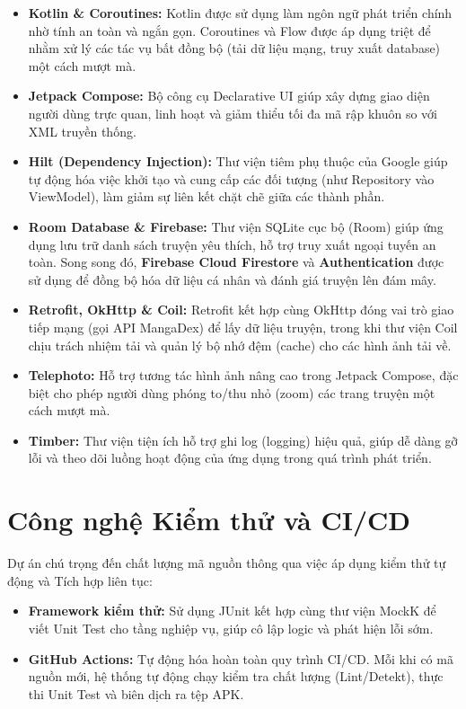 \begin{itemize}
    \item \textbf{Kotlin \& Coroutines:} Kotlin được sử dụng làm ngôn ngữ phát triển chính nhờ tính an toàn và ngắn gọn. Coroutines và Flow được áp dụng triệt để nhằm xử lý các tác vụ bất đồng bộ (tải dữ liệu mạng, truy xuất database) một cách mượt mà.
    \item \textbf{Jetpack Compose:} Bộ công cụ Declarative UI giúp xây dựng giao diện người dùng trực quan, linh hoạt và giảm thiểu tối đa mã rập khuôn so với XML truyền thống.
    \item \textbf{Hilt (Dependency Injection):} Thư viện tiêm phụ thuộc của Google giúp tự động hóa việc khởi tạo và cung cấp các đối tượng (như Repository vào ViewModel), làm giảm sự liên kết chặt chẽ giữa các thành phần.
    \item \textbf{Room Database \& Firebase:} Thư viện SQLite cục bộ (Room) giúp ứng dụng lưu trữ danh sách truyện yêu thích, hỗ trợ truy xuất ngoại tuyến an toàn. Song song đó, \textbf{Firebase Cloud Firestore} và \textbf{Authentication} được sử dụng để đồng bộ hóa dữ liệu cá nhân và đánh giá truyện lên đám mây.
    \item \textbf{Retrofit, OkHttp \& Coil:} Retrofit kết hợp cùng OkHttp đóng vai trò giao tiếp mạng (gọi API MangaDex) để lấy dữ liệu truyện, trong khi thư viện Coil chịu trách nhiệm tải và quản lý bộ nhớ đệm (cache) cho các hình ảnh tải về.
    \item \textbf{Telephoto:} Hỗ trợ tương tác hình ảnh nâng cao trong Jetpack Compose, đặc biệt cho phép người dùng phóng to/thu nhỏ (zoom) các trang truyện một cách mượt mà.
    \item \textbf{Timber:} Thư viện tiện ích hỗ trợ ghi log (logging) hiệu quả, giúp dễ dàng gỡ lỗi và theo dõi luồng hoạt động của ứng dụng trong quá trình phát triển.
\end{itemize}

\section{Công nghệ Kiểm thử và CI/CD}

Dự án chú trọng đến chất lượng mã nguồn thông qua việc áp dụng kiểm thử tự động và Tích hợp liên tục:
\begin{itemize}
    \item \textbf{Framework kiểm thử:} Sử dụng JUnit kết hợp cùng thư viện MockK để viết Unit Test cho tầng nghiệp vụ, giúp cô lập logic và phát hiện lỗi sớm.
    \item \textbf{GitHub Actions:} Tự động hóa hoàn toàn quy trình CI/CD. Mỗi khi có mã nguồn mới, hệ thống tự động chạy kiểm tra chất lượng (Lint/Detekt), thực thi Unit Test và biên dịch ra tệp APK.
\end{itemize}